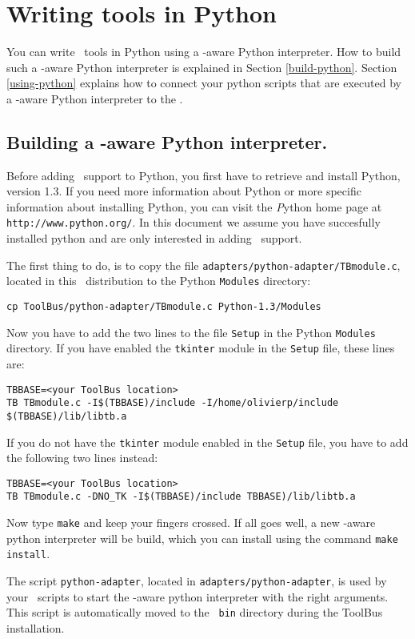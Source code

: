 
\section{\label{ToolsInPython}Writing tools in Python}

You can write \TB\ tools in Python using a \TB -aware Python interpreter.
How to build such a \TB -aware Python interpreter is explained in
Section \ref{build-python}. Section \ref{using-python} explains how
to connect your python scripts that are executed by a \TB -aware
Python interpreter to the \TB.

\subsection{\label{build-python}Building a \TB -aware Python interpreter.}

Before adding \TB\ support to Python, you first have to retrieve and
install Python, version 1.3. 
If you need more information about Python or more
specific information about installing Python, you can visit the
{\emph Python home page} at {\tt http://www.python.org/}. In this document
we assume you have succesfully installed python and are only interested
in adding \TB\ support.

The first thing to do, is to copy the file 
{\tt adapters/python-adapter/TBmodule.c}, located in this \TB\ distribution
to the Python {\tt Modules} directory:
\begin{verbatim}
cp ToolBus/python-adapter/TBmodule.c Python-1.3/Modules
\end{verbatim}
Now you have to add the two lines to the file {\tt Setup} 
in the Python {\tt Modules} directory.
If you have enabled the {\tt tkinter} module in the {\tt Setup} file,
these lines are:
\begin{verbatim}
TBBASE=<your ToolBus location>
TB TBmodule.c -I$(TBBASE)/include -I/home/olivierp/include $(TBBASE)/lib/libtb.a
\end{verbatim}
If you do not have the {\tt tkinter} module enabled in the {\tt Setup} file,
you have to add the following two lines instead:
\begin{verbatim}
TBBASE=<your ToolBus location>
TB TBmodule.c -DNO_TK -I$(TBBASE)/include TBBASE)/lib/libtb.a
\end{verbatim}
Now type {\tt make} and keep your fingers crossed. If all goes well,
a new \TB -aware python interpreter will be build, which you can install
using the command {\tt make install}.

The script {\tt python-adapter}, located in
{\tt adapters/python-adapter}, is used by your \TB\ scripts to start
the \TB -aware python interpreter with the right arguments. This
script is automatically moved to the \TB\ {\tt bin} directory during
the ToolBus installation.

